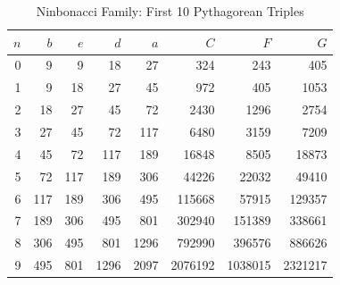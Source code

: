 \begin{table}[h!]
\centering
\caption{Ninbonacci Family: First 10 Pythagorean Triples}
\label{tab:ninbonacci}
\small
\begin{tabular}{rrrrrrrr}
\toprule
$n$ & $b$ & $e$ & $d$ & $a$ & $C$ & $F$ & $G$ \\
\midrule
0 & 9 & 9 & 18 & 27 & 324 & 243 & 405 \\
1 & 9 & 18 & 27 & 45 & 972 & 405 & 1053 \\
2 & 18 & 27 & 45 & 72 & 2430 & 1296 & 2754 \\
3 & 27 & 45 & 72 & 117 & 6480 & 3159 & 7209 \\
4 & 45 & 72 & 117 & 189 & 16848 & 8505 & 18873 \\
5 & 72 & 117 & 189 & 306 & 44226 & 22032 & 49410 \\
6 & 117 & 189 & 306 & 495 & 115668 & 57915 & 129357 \\
7 & 189 & 306 & 495 & 801 & 302940 & 151389 & 338661 \\
8 & 306 & 495 & 801 & 1296 & 792990 & 396576 & 886626 \\
9 & 495 & 801 & 1296 & 2097 & 2076192 & 1038015 & 2321217 \\
\bottomrule
\end{tabular}
\end{table}


